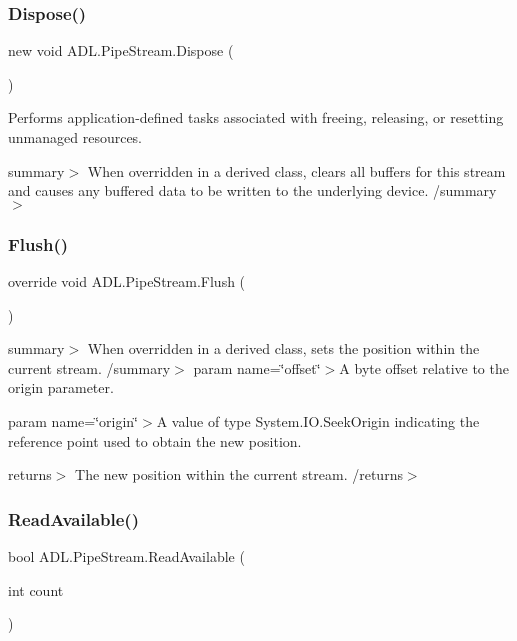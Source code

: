 \subsubsection{\texorpdfstring{Dispose()}{Dispose()}}
{\footnotesize\ttfamily new void A\+D\+L.\+Pipe\+Stream.\+Dispose (\begin{DoxyParamCaption}{ }\end{DoxyParamCaption})}



Performs application-\/defined tasks associated with freeing, releasing, or resetting unmanaged resources. 

summary$>$ When overridden in a derived class, clears all buffers for this stream and causes any buffered data to be written to the underlying device. /summary$>$ \mbox{\label{class_a_d_l_1_1_pipe_stream_aef56d04b8d784d6606ed348971eb29f3}} 
\subsubsection{\texorpdfstring{Flush()}{Flush()}}
{\footnotesize\ttfamily override void A\+D\+L.\+Pipe\+Stream.\+Flush (\begin{DoxyParamCaption}{ }\end{DoxyParamCaption})}

summary$>$ When overridden in a derived class, sets the position within the current stream. /summary$>$ param name=\char`\"{}offset\char`\"{}$>$A byte offset relative to the origin parameter. 

param name=\char`\"{}origin\char`\"{}$>$A value of type System.\+I\+O.\+Seek\+Origin indicating the reference point used to obtain the new position. 

returns$>$ The new position within the current stream. /returns$>$ \mbox{\label{class_a_d_l_1_1_pipe_stream_a82add2a351991d0f3580d4a198f44675}} 
\subsubsection{\texorpdfstring{Read\+Available()}{ReadAvailable()}}
{\footnotesize\ttfamily bool A\+D\+L.\+Pipe\+Stream.\+Read\+Available (\begin{DoxyParamCaption}\item[{int}]{count }\end{DoxyParamCaption})\hspace{0.3cm}{\ttfamily [private]}}



